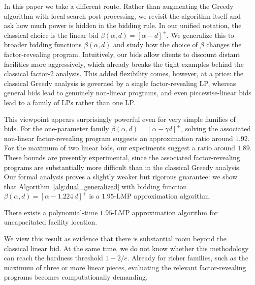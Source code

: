 In this paper we take a different route. Rather than augmenting the Greedy algorithm with local-search post-processing, we revisit the algorithm itself and ask how much power is hidden in the bidding rule. In our unified notation, the classical choice is the linear bid $\beta(\alpha,d)=[\alpha-d]^+$. We generalize this to broader bidding functions $\beta(\alpha,d)$ and study how the choice of $\beta$ changes the factor-revealing program. Intuitively, our bids allow clients to discount distant facilities more aggressively, which already breaks the tight examples behind the classical factor-$2$ analysis. This added flexibility comes, however, at a price: the classical Greedy analysis is governed by a single factor-revealing LP, whereas general bids lead to genuinely non-linear programs, and even piecewise-linear bids lead to a family of LPs rather than one LP.

This viewpoint appears surprisingly powerful even for very simple families of bids. For the one-parameter family $\beta(\alpha,d)=[\alpha-\gamma d]^+$, solving the associated non-linear factor-revealing program suggests an approximation ratio around $1.92$. For the maximum of two linear bids, our experiments suggest a ratio around $1.89$. These bounds are presently experimental, since the associated factor-revealing programs are substantially more difficult than in the classical Greedy analysis. Our formal analysis proves a slightly weaker but rigorous guarantee: we show that Algorithm~\ref{alg:dual_generalized} with bidding function $\beta(\alpha,d)=[\alpha-1.224\,d]^+$ is a $1.95$-LMP approximation algorithm.

\begin{theorem}
\label{thm:1.95-lmp-informal}
There exists a polynomial-time $1.95$-LMP approximation algorithm for uncapacitated facility location.
\end{theorem}

We view this result as evidence that there is substantial room beyond the classical linear bid. At the same time, we do not know whether this methodology can reach the hardness threshold $1+2/e$. Already for richer families, such as the maximum of three or more linear pieces, evaluating the relevant factor-revealing programs becomes computationally demanding.

